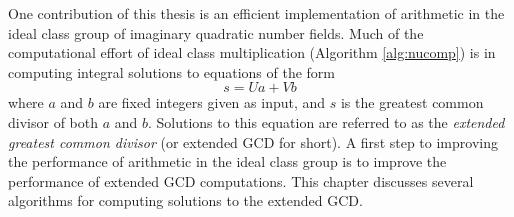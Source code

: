 \documentclass{ucalgthes1}
\theoremstyle{definition}
\newcommand{\GMP}{GMP 5.1.1}
\newcommand{\Pari}{Pari 2.5.3}
\newcommand{\MPIR}{MPIR 2.6.0}
\begin{document}



One contribution of this thesis is an efficient implementation of arithmetic in the ideal class group of imaginary quadratic number fields.  Much of the computational effort of ideal class multiplication (Algorithm \ref{alg:nucomp}) is in computing integral solutions to equations of the form
\[
	s = Ua + Vb
\]
where $a$ and $b$ are fixed integers given as input, and $s$ is the greatest common divisor of both $a$ and $b$.  Solutions to this equation are referred to as the \emph{extended greatest common divisor} (or extended GCD for short).  A first step to improving the performance of arithmetic in the ideal class group is to improve the performance of extended GCD computations.  This chapter discusses several algorithms for computing solutions to the extended GCD.
\end{document}
